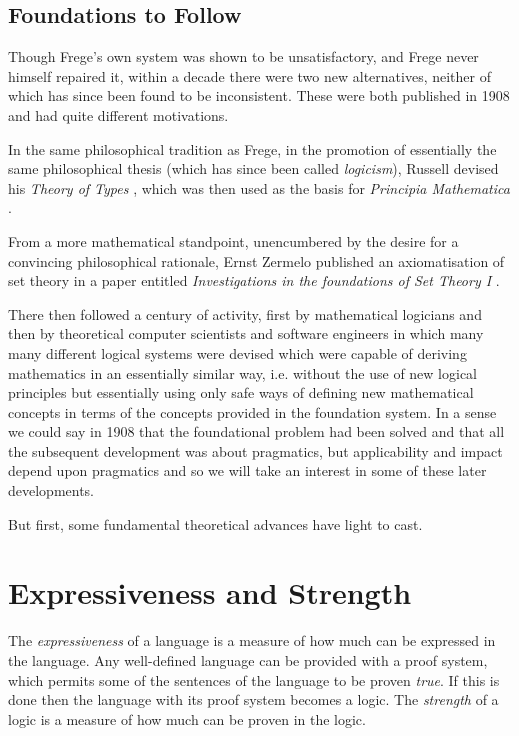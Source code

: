 
\subsection{Foundations to Follow}

Though Frege's own system was shown to be unsatisfactory, and Frege never himself repaired it, within a decade there were two new alternatives, neither of which has since been found to be inconsistent.
These were both published in 1908 and had quite different motivations.

In the same philosophical tradition as Frege, in the promotion of essentially the same philosophical thesis (which has since been called {\it logicism}), Russell devised his {\it Theory of Types} \cite{russell1908}, which was then used as the basis for {\it Principia Mathematica} \cite{russell1913}.

From a more mathematical standpoint, unencumbered by the desire for a convincing philosophical rationale, Ernst Zermelo published an axiomatisation of set theory in a paper entitled {\it Investigations in the foundations of Set Theory I} \cite{zermelo08}.

There then followed a century of activity, first by mathematical logicians and then by theoretical computer scientists and software engineers in which many many different logical systems were devised which were capable of deriving mathematics in an essentially similar way, i.e. without the use of new logical principles but essentially using only safe ways of defining new mathematical concepts in terms of the concepts provided in the foundation system.
In a sense we could say in 1908 that the foundational problem had been solved and that all the subsequent development was about pragmatics, but applicability and impact depend upon pragmatics and so we will take an interest in some of these later developments.

But first, some fundamental theoretical advances have light to cast.

\section{Expressiveness and Strength}

The {\it expressiveness} of a language is a measure of how much can be expressed in the language.
Any well-defined language can be provided with a proof system, which permits some of the sentences of the language to be proven {\it true}.
If this is done then the language with its proof system becomes a logic.
The {\it strength} of a logic is a measure of how much can be proven in the logic.

